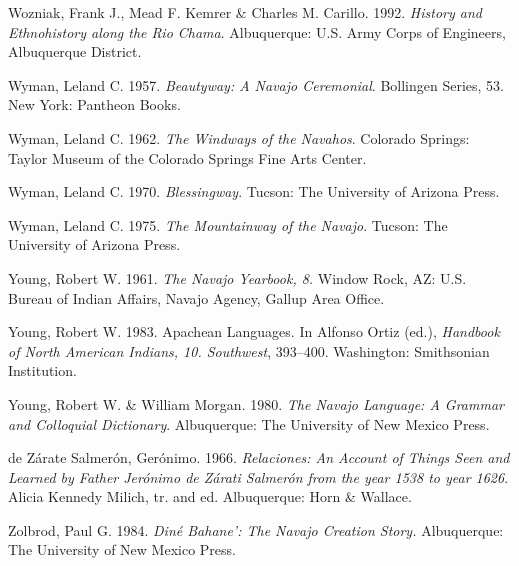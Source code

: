 \begin{hang}
	Wozniak, Frank J., Mead F. Kemrer \& Charles M. Carillo. 1992.  \textit{History and Ethnohistory along the Rio Chama}.  Albuquerque:  U.S. Army Corps of Engineers, Albuquerque District.



	Wyman, Leland C. 1957.  \textit{Beautyway: A Navajo Ceremonial}.  Bollingen Series, 53.  New York:  Pantheon Books.

	Wyman, Leland C. 1962.  \textit{The Windways of the Navahos}.  Colorado Springs:  Taylor Museum of the Colorado Springs Fine Arts Center.

	Wyman, Leland C. 1970.  \textit{Blessingway}.  Tucson:  The University of Arizona Press.

	Wyman, Leland C. 1975.  \textit{The Mountainway of the Navajo}.  Tucson:  The University of Arizona Press.



	Young, Robert W. 1961.  \textit{The Navajo Yearbook, 8.}  Window Rock, AZ:  U.S. Bureau of Indian Affairs, Navajo Agency, Gallup Area Office.

	Young, Robert W. 1983.  Apachean Languages.  In Alfonso Ortiz (ed.), \textit{Handbook of North American Indians, 10.  Southwest},  393--400.  Washington:  Smithsonian Institution.


	Young, Robert W. \& William Morgan. 1980.  \textit{The Navajo Language: A Grammar and Colloquial Dictionary}.  Albuquerque:  The University of New Mexico Press.

	de Zárate Salmerón, Gerónimo. 1966. \textit{Relaciones: An Account of Things Seen and Learned by Father Jerónimo de Zárati Salmerón from the year 1538 to year 1626}.  Alicia Kennedy Milich, tr. and ed.  Albuquerque: Horn \& Wallace.

	Zolbrod, Paul G. 1984.  \textit{Diné Bahane’: The Navajo Creation Story.}  Albuquerque:  The University of New Mexico Press.

\end{hang}


\label{jett-ch-end}
